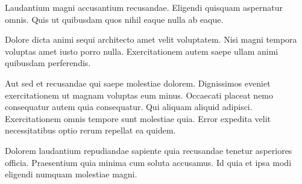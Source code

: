 

Laudantium magni accusantium recusandae. Eligendi quisquam aspernatur omnis. Quis ut quibusdam quos nihil eaque nulla ab eaque.

Dolore dicta animi sequi architecto amet velit voluptatem. Nisi magni tempora voluptas amet iusto porro nulla. Exercitationem autem saepe ullam animi quibusdam perferendis.

Aut sed et recusandae qui saepe molestiae dolorem. Dignissimos eveniet exercitationem ut magnam voluptas eum minus. Occaecati placeat nemo consequatur autem quia consequatur. Qui aliquam aliquid adipisci. Exercitationem omnis tempore sunt molestiae quia. Error expedita velit necessitatibus optio rerum repellat ea quidem.

Dolorem laudantium repudiandae sapiente quia recusandae tenetur asperiores officia. Praesentium quia minima cum soluta accusamus. Id quia et ipsa modi eligendi numquam molestiae magni.
